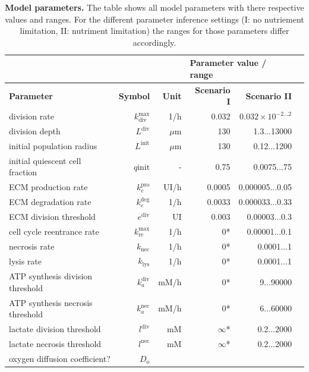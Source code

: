 \documentclass[10pt,letterpaper]{article}
\newcommand{\sI}[1]{{\color{red}#1}}
\newcommand{\sII}[1]{{\color{blue}#1}}
\begin{document}
\begin{table}[!ht]
\begin{adjustwidth}{-0.5in}{0in} %
\caption{
{\bf Model parameters.} The table shows all model parameters with there respective values and ranges. For the different parameter inference settings (I: no nutriement limitation, II: nutriment limitation) the ranges for those parameters differ accordingly. }
\begin{tabular}{|p{6cm}|r|r|r|r|r|}
\hline
\multicolumn{3}{|l|}{\bf } & \multicolumn{2}{|l|}{\bf Parameter value / range}\\ \hline
{\bf Parameter} 					&{\bf Symbol} &{\bf Unit} &\sI{\bf Scenario I} &\sII{\bf Scenario II}\\ \hline
division rate 					&$k_{\text{div}}^{\max}$ & 1/h & 0.032 & $0.032 \times 10^{-2...2}$\\ \hline
division depth 					&$L^{\text{div}}$ & $\mu$m & 130 & 1.3...13000\\ \hline
initial population radius 			&$L^{\text{init}}$ & $\mu$m & 130 & 0.12...1200\\ \hline
initial quiescent cell fraction 		& $q{\text{init}}$ &-& 0.75& 0.0075...75\\ \hline
ECM production rate 			&$k_{e}^{\text{pro}}$  & {\color{green}UI}/h&0.0005 &0.000005...0.05\\ \hline
ECM degradation rate 			&$k_{e}^{\text{deg}}$ &1/h&0.0033 &0.000033...0.33\\ \hline
ECM division threshold 			&$e^{\text{div}}$ &{\color{green}UI} &0.003 &0.00003...0.3\\ \hline
\hline
cell cycle reentrance rate 			&$k^{\max}_{\text{re}}$ &1/h &0*&0.00001...0.1\\ \hline
necrosis rate 					&$k_{\text{nec}}$ &1/h&0*&0.0001...1\\ \hline
lysis rate 						&$k_{\text{lys}}$ &1/h&0*&0.0001...1\\ \hline
ATP synthesis division threshold 			&$k_a^{\text{div}}$ &mM/h& 0*& 9...90000\\ \hline
ATP synthesis necrosis threshold 			&$k_a^{\text{nec}}$ &mM/h& 0*& 6...60000\\ \hline
lactate division threshold 			&$l^{\text{div}}$  &mM&$\infty$* & 0.2...2000\\ \hline
lactate necrosis threshold 			&$l^{\text{nec}}$ &mM &$\infty$* & 0.2...2000\\ \hline
{\color{green}oxygen diffusion coefficient?} 			&$D_o$&  &  &  \\ \hline

\end{tabular}
\end{adjustwidth}
\end{table}
\end{document}
